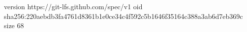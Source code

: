 version https://git-lfs.github.com/spec/v1
oid sha256:220aebdb3fa4761d8361b1e0ce34c4f592c5b1646f35164c388a3ab6d7eb369c
size 68
